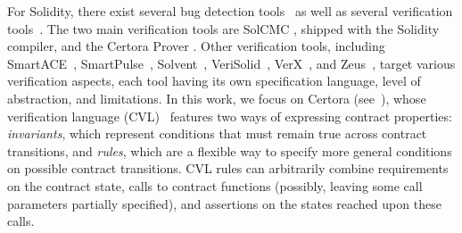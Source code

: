 For Solidity, there exist several bug detection tools~\cite{Kushwaha22access} as well as several verification tools~\cite{Tolmach22csur}. 
The two main verification tools are SolCMC \cite{Solcmc}, shipped with the Solidity compiler, and the Certora Prover \cite{certora}. 
Other verification tools, including
SmartACE~\cite{Wesley22vmcai}, 
SmartPulse~\cite{Stephens21sp},   
Solvent~\cite{Solvent},
VeriSolid~\cite{Nelaturu23tdsc},
VerX~\cite{Permenev20sp}, and 
Zeus~\cite{Kalra18ndss},
target various verification aspects,
each tool having its own specification language,
level of abstraction, 
and limitations.
%
In this work, we focus on Certora (see~), whose verification language (CVL)~\cite{certora-cvl} features two ways of expressing contract properties:
\emph{invariants}, which represent conditions that must remain true across contract transitions, and \emph{rules}, which are a flexible way to specify more general conditions on possible contract transitions. CVL rules can arbitrarily combine requirements on the contract state, calls to contract functions (possibly, leaving some call parameters partially specified), and assertions on the states reached upon these calls.


